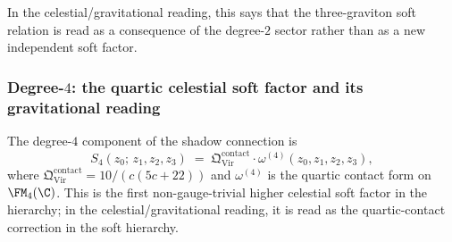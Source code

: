 In the celestial/gravitational reading, this says that the
three-graviton soft relation is read as a consequence of the
degree-$2$ sector rather than as a new independent soft factor.

\subsubsection*{Degree-$4$: the quartic celestial soft factor and its gravitational reading}

\begin{theorem}
\label{thm:gravity-quartic-soft}
The degree-$4$ component of the shadow connection is
\begin{equation}\label{eq:gravity-S4}
S_4(z_0;\, z_1, z_2, z_3)
\;=\;
\mathfrak{Q}^{\mathrm{contact}}_{\mathrm{Vir}}
\cdot
\omega^{(4)}(z_0, z_1, z_2, z_3),
\end{equation}
where $\mathfrak{Q}^{\mathrm{contact}}_{\mathrm{Vir}}
= 10/(c(5c+22))$ and $\omega^{(4)}$ is the quartic contact
form on $\FM_4(\C)$. This is the first non-gauge-trivial higher
celestial soft factor in the hierarchy; in the
celestial/gravitational reading, it is read as the quartic-contact
correction in the soft hierarchy.
\end{theorem}

